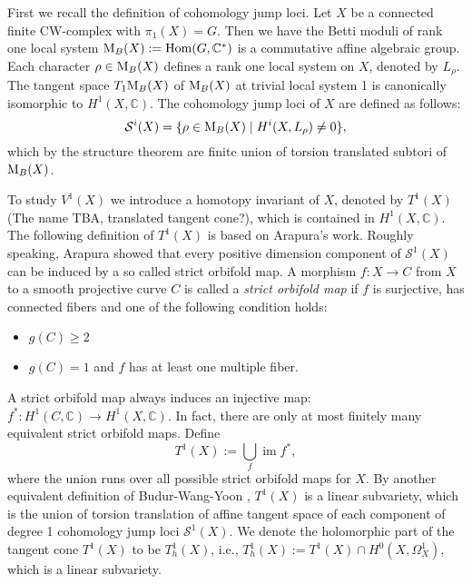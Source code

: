 \documentclass[a4paper,12pt,reqno]{amsart}
\theoremstyle{plain}
\theoremstyle{remark}
\newcommand{\C}{\mathbb C}
\newcommand{\im}{\operatorname{im}}
\newcommand{\Hom}{\operatorname{Hom}}
\begin{document}

First we recall the definition of cohomology jump loci. Let $X$ be a connected finite CW-complex with $\pi_{1}(X)=G$. Then we have the Betti moduli of rank one local system $\textnormal{M}_B(X):= \Hom(G,\C^{\ast})$ is a commutative affine algebraic group. Each character $\rho \in \textnormal{M}_B(X)$ defines a rank one local system on $X$, denoted by $L_{\rho}$. The tangent space $T_1\textnormal{M}_B(X)$ of $\textnormal{M}_B(X)$ at trivial local system 1 is canonically isomorphic to $H^1(X, \C)$.
The cohomology jump loci of $X$ are defined as follows:
$$\mathcal{S}^i(X)=\lbrace \rho\in \textnormal{M}_B(X) \mid  H^{i}(X, L_{\rho})\neq 0 \rbrace,$$ 
which by the structure theorem are finite union of torsion translated subtori of $\textnormal{M}_B(X)$.

To study $V^1(X)$ we introduce a homotopy invariant of $X$, denoted by $T^1(X)${\color{red} (The name TBA, translated tangent cone?)}, which is contained in $H^1(X, \C)$. The following definition of $T^1(X)$ is based on Arapura's work. Roughly speaking, Arapura \cite{Ara97} showed that every positive dimension component of $\mathcal{S}^1(X)$ can be induced by a so called strict orbifold map. A morphism $f:X\to C$ from $X$ to a smooth projective curve $C$ is called a  {\it strict orbifold map} if $f $ is surjective, has connected fibers and one of the following condition holds:
\begin{itemize}
\item $g(C)\geq 2$
\item $g(C)=1$ and $f$ has at least one multiple fiber.
\end{itemize}
A strict orbifold map always induces an injective map: $f^*: H^1(C, \C) \to H^1(X,\C)$. In fact, there are only at most finitely many equivalent strict orbifold maps. Define $$T^1(X):= \bigcup_f \im f^*,$$
where the union runs over all possible strict orbifold maps for $X$. By another equivalent definition of Budur-Wang-Yoon \cite{BWY16} , $T^1(X)$ is a linear subvariety, which is the union of torsion translation of affine tangent space of each component of degree 1 cohomology jump loci $\mathcal{S}^1(X)$. We denote the holomorphic part of the tangent cone $T^1(X)$ to be $T^1_h(X)$, i.e., $T_h^1(X):=T^1(X)\cap H^0(X, \Omega_X^1)$, which is a linear subvariety.
\end{document}
